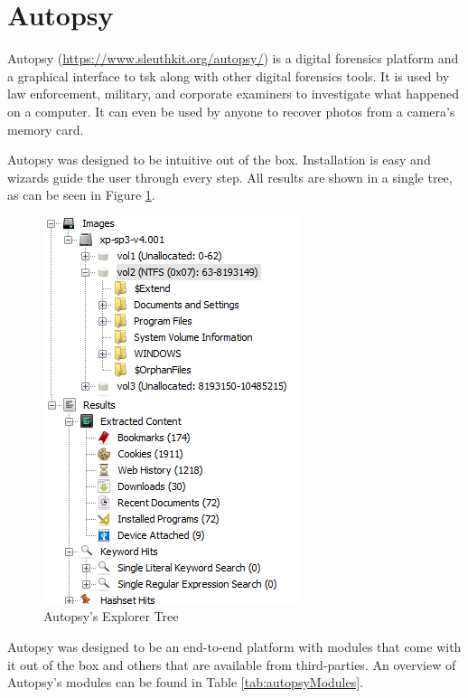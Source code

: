 \section{Autopsy}

Autopsy (\href{https://www.sleuthkit.org/autopsy/}{https://www.sleuthkit.org/autopsy/}) is a digital forensics platform and a graphical interface to \acrshort{tsk}
along with other digital forensics tools. It is used by law enforcement, military, 
and corporate examiners to investigate what happened on a computer. It can even 
be used by anyone to recover photos from a camera's memory card.

Autopsy was designed to be intuitive out of the box. Installation is easy and
wizards guide the user through every step. All results are shown in a single tree, as can be seen in Figure \ref{fig:tree}.

\begin{figure}[ht]
 \centering
 \includegraphics[width=0.5\linewidth]{imgs/tree.png}
 \caption{Autopsy's Explorer Tree}
 \label{fig:tree}
\end{figure}

Autopsy was designed to be an end-to-end platform with modules that come with
it out of the box and others that are available from third-parties. An overview of Autopsy's modules can be found in Table \ref{tab:autopsyModules}.

